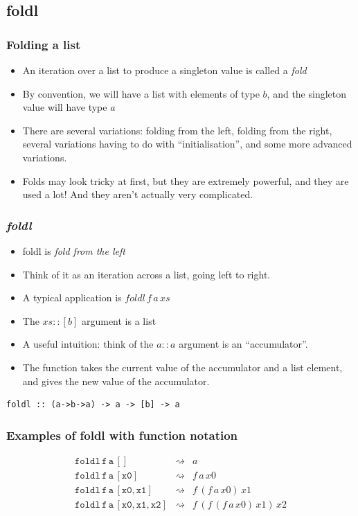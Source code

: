 \documentclass{beamer}
\begin{document}
\subsection{foldl}
\begin{frame}
\frametitle{Folding a list}

\begin{itemize}
\item An iteration over a list to produce a singleton value is
  called a \emph{fold}
\item By convention, we will have a list with elements of type $b$,
  and the singleton value will have type $a$
\item There are several variations: folding from the left, folding
  from the right, several variations having to do with
  ``initialisation'', and some more advanced variations.
\item Folds may look tricky at first, but they are extremely
  powerful, and they are used a lot!  And they aren't actually very
  complicated.
\end{itemize}

\end{frame}

\begin{frame}[fragile]
\frametitle{\emph{foldl}}

\begin{itemize}
\item foldl is \emph{fold from the left}
\item Think of it as an iteration across a list, going left to
  right.
\item A typical application is $foldl\, f\, a\, xs$
\item The $xs :: [b]$ argument is a list
\item A useful intuition: think of the $a :: a$ argument is an
  ``accumulator''.
\item The function takes the current value of the accumulator and a
  list element, and gives the new value of the accumulator.
\end{itemize}

\begin{verbatim}
foldl :: (a->b->a) -> a -> [b] -> a
\end{verbatim}

\end{frame}

\begin{frame}
\frametitle{Examples of foldl with function notation}

\begin{eqnarray*}
\mathtt{foldl\,f\,a\,[]} & \rightsquigarrow & a\\
\mathtt{foldl\,f\,a\,[x0]} & \rightsquigarrow  & f\,a\,x0\\
\mathtt{foldl\,f\,a\,[x0,x1]} & \rightsquigarrow  & f\,(f\,a\,x0)\,x1\\
\mathtt{foldl\,f\,a\,[x0,x1,x2]} & \rightsquigarrow  & f\,(f\,(f\,a\,x0)\,x1)\, x2
\end{eqnarray*}

\end{frame}
\end{document}
